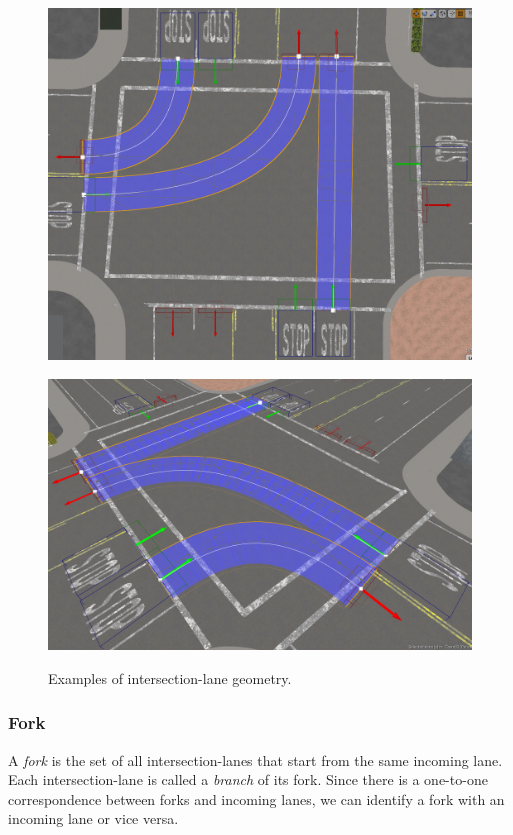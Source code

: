\begin{figure}%
  \centering
  \begin{minipage}[t]{.43\linewidth}
    {\includegraphics[width=\linewidth]{figures/chapter3/intersection-lane.png}}%
  \end{minipage}%
  \hfill
  \begin{minipage}[t]{.555\linewidth}
    {\includegraphics[width=\linewidth]{figures/chapter3/intersection-lane_perspective.png}}%
  \end{minipage}%
  \caption{Examples of intersection-lane geometry.}\label{fig:intersection-lane}%
\end{figure}%
\subsubsection{Fork}
A \emph{fork} is the set of
all intersection-lanes that start from the same incoming lane.
Each intersection-lane is called a \emph{branch} of its fork.
Since there is a one-to-one correspondence between forks and incoming lanes,
we can identify a fork with an incoming lane or vice versa.
